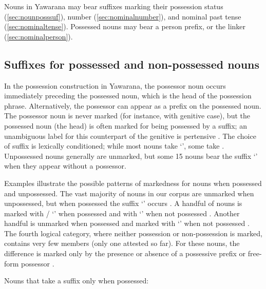 \documentclass{memoir}
\begin{document}
Nouns in Yawarana may bear suffixes marking their possession status
(\cref{sec:nounposssuf}), number (\cref{sec:nominalnumber}), and nominal
past tense (\cref{sec:nominaltense}). Possessed nouns may bear a person
prefix, or the linker  (\cref{sec:nominalperson}).


\subsection{\texorpdfstring{Suffixes for possessed and non-possessed
nouns
\label{sec:nounposssuf}}{Suffixes for possessed and non-possessed nouns }}

In the possession construction in Yawarana, the possessor noun occurs
immediately preceding the possessed noun, which is the head of the
possession phrase.  Alternatively,
the possessor can appear as a prefix on the possessed noun. The
possessor noun is never marked (for instance, with genitive case), but
the possessed noun (the head) is often marked for being possessed by a
suffix; an unambiguous label for this counterpart of the genitive is
pertensive \parencites{dixon2010basic}. The choice of suffix is
lexically conditioned; while most nouns take  `', some
take . Unpossessed nouns generally are unmarked, but some 15
nouns  bear the suffix  `'
when they appear without a possessor.

Examples  illustrate the
possible patterns of markedness for nouns when possessed and
unpossessed. The vast majority of nouns in our corpus are unmarked when
unpossessed, but when possessed the suffix  `' occurs
. A handful of nouns  is
marked with / `' when possessed and with
 `' when not possessed .
Another handful is unmarked when possessed and marked with 
`' when not possessed . The fourth
logical category, where neither possession or non-possession is marked,
contains very few members (only one attested so far). For these nouns,
the difference is marked only by the presence or absence of a possessive
prefix or free-form possessor .

\ex\label{onlypossessed} Nouns that take a suffix only when possessed:
\end{document}
